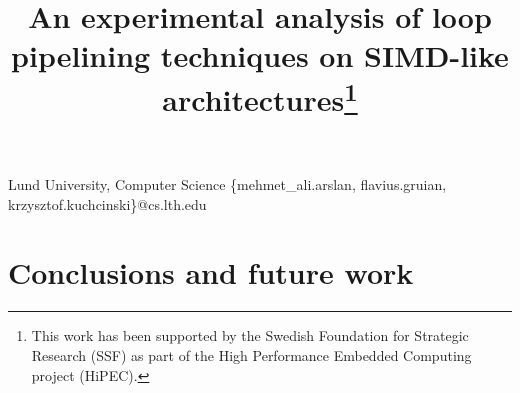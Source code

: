\documentclass[preprint, nocopyrightspace]{sigplanconf}
\begin{document}

\title{An experimental analysis of loop pipelining techniques on SIMD-like architectures\thanks{This work has been supported by the Swedish Foundation for Strategic Research (SSF) as part of the High Performance Embedded Computing project (HiPEC).}}

{Lund University, Computer Science}
{\{mehmet\_{}ali.arslan, flavius.gruian, krzysztof.kuchcinski\}@cs.lth.edu}


\maketitle
\begin{abstract}

\end{abstract}









\section{Conclusions and future work}



\end{document}

